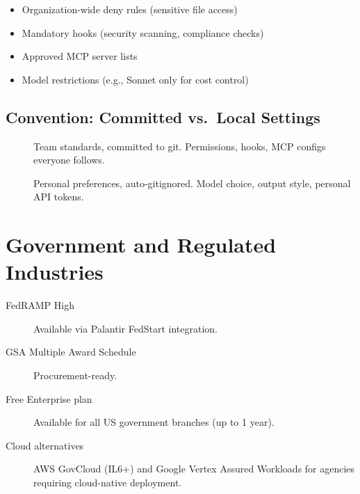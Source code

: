 \begin{itemize}
  \item Organization-wide deny rules (sensitive file access)
  \item Mandatory hooks (security scanning, compliance checks)
  \item Approved MCP server lists
  \item Model restrictions (e.g., Sonnet only for cost control)
\end{itemize}

\subsection{Convention: Committed vs.\ Local Settings}


\begin{description}
  \item[] Team standards, committed to git.
    Permissions, hooks, MCP configs everyone follows.
  \item[] Personal preferences, auto-gitignored.
    Model choice, output style, personal API tokens.
\end{description}

\section{Government and Regulated Industries}
\label{sec:government}



\begin{description}
  \item[FedRAMP High] Available via Palantir FedStart integration.
  \item[GSA Multiple Award Schedule] Procurement-ready.
  \item[Free Enterprise plan] Available for all US government branches (up to 1 year).
  \item[Cloud alternatives] AWS GovCloud (IL6+) and Google Vertex Assured Workloads
    for agencies requiring cloud-native deployment.
\end{description}

